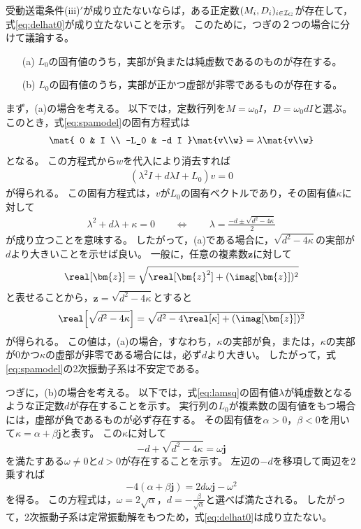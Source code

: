 \documentclass[tombow,dvipdfmx]{corona-a5-1.1}
\begin{document}
\begin{証明}
受動送電条件(iii)$'$が成り立たないならば，ある正定数$(M_i,D_i)_{i \in \mathcal{I}_{\rm G}}$が存在して，式\ref{eq:delhat0}が成り立たないことを示す。
このために，つぎの２つの場合に分けて議論する。
\begin{itemize}
\item[(a)] $L_0$の固有値のうち，実部が負または純虚数であるのものが存在する。
\item[(b)] $L_0$の固有値のうち，実部が正かつ虚部が非零であるものが存在する。
\end{itemize}
まず，(a)の場合を考える。
以下では，定数行列を$M=\omega_0 I$，$D=\omega_0 d I$と選ぶ。
このとき，式\ref{eq:spamodel}の固有方程式は
\begin{align*}
\mat{
0 & I \\
-L_0 & -d I
}
\mat{v\\w}
=
\lambda \mat{v\\w}
\end{align*}
となる。
この方程式から$w$を代入により消去すれば
\begin{align*}
\left(\lambda^2 I +d \lambda I + L_0
\right) v =0
\end{align*}
が得られる。
この固有方程式は，$v$が$L_0$の固有ベクトルであり，その固有値$\kappa$に対して
\begin{align}\label{eq:lamsq}
\lambda^2 + d\lambda +\kappa =0
\qquad
\Longleftrightarrow
\qquad
\lambda = \frac{-d \pm \sqrt{d^2-4\kappa} }{2}
\end{align}
が成り立つことを意味する。
したがって，(a)である場合に，$\sqrt{d^2 - 4\kappa }$の実部が$d$より大きいことを示せば良い。
一般に，任意の複素数$\bm{z}$に対して
\begin{align*}
\real[\bm{z}] = \sqrt{ \real[\bm{z}^2 ] + (\imag[\bm{z}])^2 }
\end{align*}
と表せることから，$\bm{z} = \sqrt{d^2 - 4\kappa }$とすると
\begin{align*}
\real \Bigl[
\sqrt{d^2 - 4\kappa }
\Bigr]
=\sqrt{
d^2 - 4 \real[\kappa]
+
(\imag[ \bm{z} ])^2
}
\end{align*}
が得られる。
この値は，(a)の場合，すなわち，$\kappa$の実部が負，または，$\kappa$の実部が0かつ$\kappa$の虚部が非零である場合には，必ず$d$より大きい。
したがって，式\ref{eq:spamodel}の2次振動子系は不安定である。

つぎに，(b)の場合を考える。
以下では，式\ref{eq:lamsq}の固有値$\lambda$が純虚数となるような正定数$d$が存在することを示す。
実行列の$L_0$が複素数の固有値をもつ場合には，虚部が負であるものが必ず存在する。
その固有値を$\alpha>0$，$\beta < 0$を用いて$\kappa = \alpha + \beta \bm{j}$と表す。
この$\kappa$に対して
\[
-d + \sqrt{d^2-4\kappa}  = \omega \bm{j}
\]
を満たすある$\omega\neq 0$と$d>0$が存在することを示す。
左辺の$-d$を移項して両辺を2乗すれば
\[
-4 (\alpha + \beta \bm{j}) = 2d \omega \bm{j} -\omega^2
\]
を得る。
この方程式は，$\omega = 2\sqrt{\alpha}$，$d=-\tfrac{\beta}{\sqrt{\alpha}}$と選べば満たされる。
したがって，2次振動子系は定常振動解をもつため，式\ref{eq:delhat0}は成り立たない。
\end{証明}
\end{document}
